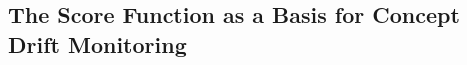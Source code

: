 \documentclass[twoside,11pt]{article}
\begin{document}

\subsection{The Score Function as a Basis for Concept Drift Monitoring}
\label{ss:score_func}
\end{document}
